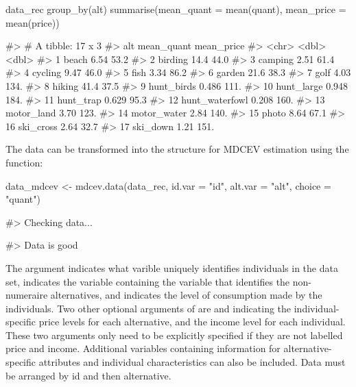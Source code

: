 \begin{Schunk}
\begin{Sinput}
data_rec %>%
    group_by(alt) %>%
    summarise(mean_quant = mean(quant),
                  mean_price = mean(price))
\end{Sinput}
\begin{Soutput}
#> # A tibble: 17 x 3
#>    alt            mean_quant mean_price
#>    <chr>               <dbl>      <dbl>
#>  1 beach               6.54        53.2
#>  2 birding            14.4         44.0
#>  3 camping             2.51        61.4
#>  4 cycling             9.47        46.0
#>  5 fish                3.34        86.2
#>  6 garden             21.6         38.3
#>  7 golf                4.03       134. 
#>  8 hiking             41.4         37.5
#>  9 hunt_birds          0.486      111. 
#> 10 hunt_large          0.948      184. 
#> 11 hunt_trap           0.629       95.3
#> 12 hunt_waterfowl      0.208      160. 
#> 13 motor_land          3.70       123. 
#> 14 motor_water         2.84       140. 
#> 15 photo               8.64        67.1
#> 16 ski_cross           2.64        32.7
#> 17 ski_down            1.21       151.
\end{Soutput}
\end{Schunk}

The data can be transformed into the structure for MDCEV estimation
using the  function:

\begin{Schunk}
\begin{Sinput}
data_mdcev <- mdcev.data(data_rec,
                       id.var = "id",
                       alt.var = "alt",
                       choice = "quant")
\end{Sinput}
\begin{Soutput}
#> Checking data...
\end{Soutput}
\begin{Soutput}
#> Data is good
\end{Soutput}
\end{Schunk}

The  argument indicates what varible uniquely identifies
individuals in the data set,  indicates the variable
containing the variable that identifies the non-numeraire alternatives,
and  indicates the level of consumption made by the
individuals. Two other optional arguments of  are
 and  indicating the individual-specific price
levels for each alternative, and the income level for each individual.
These two arguments only need to be explicitly specified if they are not
labelled price and income. Additional variables containing information
for alternative-specific attributes and individual characteristics can
also be included. Data must be arranged by id and then alternative.

